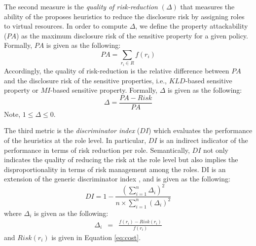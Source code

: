 The second measure is the \emph{quality of risk-reduction} $(\Delta)$ that measures the ability of the proposes heuristics to reduce the disclosure risk by assigning roles to virtual resources. In order to compute $\Delta$, we define the property attackability ($PA$) as the maximum disclosure risk of the sensitive property for a given policy. Formally, $PA$ is given as the following: 
\begin{equation}
PA = \sum_{r_i \in R} f(r_i)
\end{equation}
 Accordingly, the quality of risk-reduction is the relative difference between $PA$ and the disclosure risk of the sensitive properties, i.e., $KLD$-based sensitive property or $MI$-based sensitive property. Formally, $\Delta$ is given as the following:
\begin{equation}
\label{eq:QoR}
\Delta = \frac{PA - Risk}{PA}
\end{equation}
Note, $ 1 \le \Delta \le 0$.

The third metric is the \textit{discriminator index} ($DI$)  which evaluates the performance of the heuristics at the role level. In particular, $DI$ is an indirect indicator of the performance in terms of risk reduction per role. Semantically, $DI$ not only indicates the quality of reducing the risk at the role level but also implies the disproportionality in terms of risk management among the roles. DI is an extension of the generic discriminator index \cite{jain1984quantitative}, and is given as the following:
\begin{equation}
\label{eq:DI}
 DI = 1- \frac{(\sum_{i=1}^n \Delta_i)^2}{n\times \sum_{i=1}^{n}(\Delta_i)^2} 
\end{equation}
where $\Delta_i$ is given as the following:
\begin{eqnarray*}
\Delta_i &= &\frac{f(r_i) - Risk(r_i)}{f(r_i)}
\end{eqnarray*}
and $Risk(r_i)$ is given in Equation \ref{eq:cost}.
%


